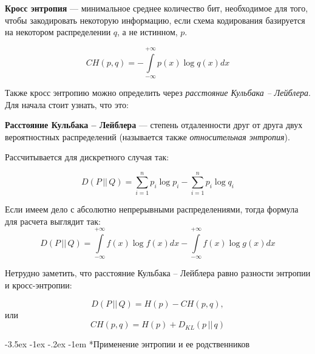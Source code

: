 \documentclass[a4paper, 12pt]{scrreprt}
\makeatletter
\newcommand{\ot}[1]{\textcolor[rgb]{.55,.45,.55}{#1}}
\renewcommand\section{\@startsection{section}{1}{\z@}%
        {-3.5ex \@plus -1ex \@minus -.2ex}%
        {-1em}%
        {\normalfont\large\slshape\bfseries\ot}}
\makeatother
\begin{document}
\begin{siderules}
    \textbf{Кросс энтропия} --- минимальное среднее количество бит, необходимое для того, чтобы закодировать некоторую информацию, если схема кодирования базируется на некотором распределении $q$, а не истинном, $p$.
\end{siderules}

\[CH(p, q)=-\int\limits_{-\infty}^{+\infty}p(x)\log q(x) dx  \]

Также кросс энтропию можно определить через \textit{расстояние Кульбака -- Лейблера}. Для начала стоит узнать, что это:

\begin{siderules}
    \textbf{Расстояние Кульбака -- Лейблера} --- степень отдаленности друг от друга двух вероятностных распределений (называется также \textit{относительная энтропия}). \end{siderules}
    
    Рассчитывается для дискретного случая так:

    \[D(P\, ||\, Q)=\sum\limits_{i=1}^n p_i\log p_i-\sum\limits_{i=1}^n p_i\log q_i\]

    Если имеем дело с абсолютно непрерывными распределениями, тогда формула для расчета выглядит так:
    \[D(P\, ||\, Q)=\int\limits_{-\infty}^{+\infty} f(x)\log f(x)dx -\int\limits_{-\infty}^{+\infty} f(x)\log g(x)dx  \]

Нетрудно заметить, что расстояние Кульбака -- Лейблера равно разности энтропии и кросс-энтропии:

\[D(P\, ||\, Q)=H(p)-CH(p,q),\]
или
\[CH(p, q)=H(p)+D_{KL}(p\, || \, q)\]

\section*{Применение энтропии и ее родственников}~\
\\
\end{document}
